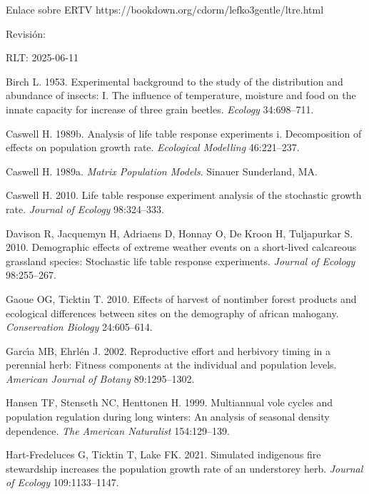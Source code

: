 \documentclass[
  12pt,
  letterpaper,
]{book}
\newlength{\cslhangindent}
\newenvironment{CSLReferences}[2] %
 {\begin{list}{}{%
  \setlength{\itemindent}{0pt}
  \setlength{\leftmargin}{0pt}
  \setlength{\parsep}{0pt}
  \ifodd #1
   \setlength{\leftmargin}{\cslhangindent}
   \setlength{\itemindent}{-1\cslhangindent}
  \fi
  \setlength{\itemsep}{#2\baselineskip}}}
 {\end{list}}
\begin{document}
Enlace sobre ERTV https://bookdown.org/cdorm/lefko3gentle/ltre.html

Revisión:

RLT: 2025-06-11

\label{refs}
\begin{CSLReferences}{1}{0}
Birch L. 1953. Experimental background to the study of the distribution
and abundance of insects: I. The influence of temperature, moisture and
food on the innate capacity for increase of three grain beetles.
\emph{Ecology} 34:698--711.

Caswell H. 1989b. Analysis of life table response experiments i.
Decomposition of effects on population growth rate. \emph{Ecological
Modelling} 46:221--237.

Caswell H. 1989a. \emph{Matrix {P}opulation {M}odels}. Sinauer
Sunderland, MA.

Caswell H. 2010. Life table response experiment analysis of the
stochastic growth rate. \emph{Journal of Ecology} 98:324--333.

Davison R, Jacquemyn H, Adriaens D, Honnay O, De Kroon H, Tuljapurkar S.
2010. Demographic effects of extreme weather events on a short-lived
calcareous grassland species: Stochastic life table response
experiments. \emph{Journal of Ecology} 98:255--267.

Gaoue OG, Ticktin T. 2010. Effects of harvest of nontimber forest
products and ecological differences between sites on the demography of
african mahogany. \emph{Conservation Biology} 24:605--614.

Garcı́a MB, Ehrlén J. 2002. Reproductive effort and herbivory timing in a
perennial herb: Fitness components at the individual and population
levels. \emph{American Journal of Botany} 89:1295--1302.

Hansen TF, Stenseth NC, Henttonen H. 1999. Multiannual vole cycles and
population regulation during long winters: An analysis of seasonal
density dependence. \emph{The American Naturalist} 154:129--139.

Hart-Fredeluces G, Ticktin T, Lake FK. 2021. Simulated indigenous fire
stewardship increases the population growth rate of an understorey herb.
\emph{Journal of Ecology} 109:1133--1147.


\end{CSLReferences}
\end{document}
